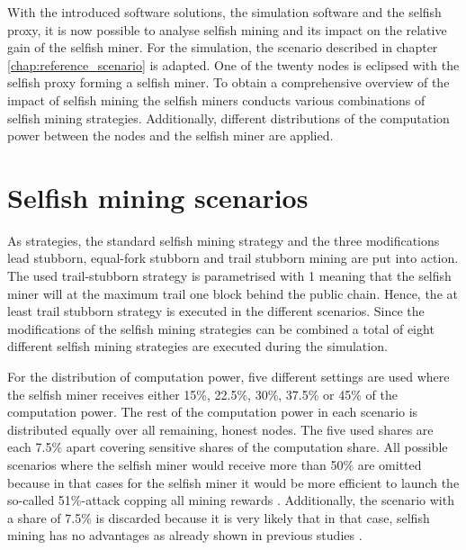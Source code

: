 With the introduced software solutions, the simulation software and the selfish proxy, it is now possible to analyse selfish mining and its impact on the relative gain of the selfish miner.
For the simulation, the scenario described in chapter \ref{chap:reference_scenario} is adapted.
One of the twenty nodes is eclipsed with the selfish proxy forming a selfish miner.
To obtain a comprehensive overview of the impact of selfish mining the selfish miners conducts various combinations of selfish mining strategies.
Additionally, different distributions of the computation power between the nodes and the selfish miner are applied.


\section{Selfish mining scenarios}

As strategies, the standard selfish mining strategy and the three modifications lead stubborn, equal-fork stubborn and trail stubborn mining are put into action.
The used trail-stubborn strategy is parametrised with 1 meaning that the selfish miner will at the maximum trail one block behind the public chain.
Hence, the at least trail stubborn strategy is executed in the different scenarios.
Since the modifications of the selfish mining strategies can be combined a total of eight different selfish mining strategies are executed during the simulation.

For the distribution of computation power, five different settings are used where the selfish miner receives either 15\%, 22.5\%, 30\%, 37.5\% or 45\% of the computation power.
The rest of the computation power in each scenario is distributed equally over all remaining, honest nodes.
The five used shares are each 7.5\% apart covering sensitive shares of the computation share.
All possible scenarios where the selfish miner would receive more than 50\% are omitted because in that cases for the selfish miner it would be more efficient to launch the so-called 51\%-attack copping all mining rewards \cite{nakamoto2008bitcoin, clarkresearch, tschorsch2016bitcoin}.
Additionally, the scenario with a share of 7.5\% is discarded because it is very likely that in that case, selfish mining has no advantages as already shown in previous studies \cite{eyal2014majority, sapirshtein2016optimal, nayak2016stubborn}.

